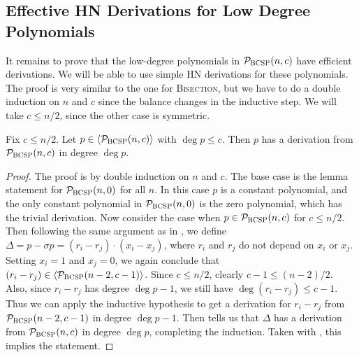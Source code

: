 \subsection{Effective HN Derivations for Low Degree Polynomials}
It remains to prove that the low-degree polynomials in $\mathcal P_{\textsc{BCSP}}(n,c)$ have efficient derivations. We will be able to use simple HN derivations for these polynomials. The proof is very similar to the one for \textsc{Bisection}, but we have to do a double induction on $n$ and $c$ since the balance changes in the inductive step. We will take $c \leq n/2$, since the other case is symmetric.
\begin{lemma}\label{lem:lowdeg-easy}
Fix $c \leq n/2$. Let $p \in \langle \mathcal P_{\textsc{BCSP}}(n,c) \rangle$ with $\deg p \leq c$. Then $p$ has a derivation from $\mathcal P_{\textsc{BCSP}}(n,c)$ in degree $\deg p$. 
\end{lemma}
\begin{proof}
The proof is by double induction on $n$ and $c$. The base case is the lemma statement for $\mathcal P_{\textsc{BCSP}}(n,0)$ for all $n$. In this case $p$ is a constant polynomial, and the only constant polynomial in $\mathcal P_{\textsc{BCSP}}(n,0)$ is the zero polynomial, which has the trivial derivation. Now consider the case when $p \in \mathcal P_{\textsc{BCSP}}(n,c)$ for $c \leq n/2$. Then following the same argument as in , we define $\Delta = p - \sigma p = (r_i - r_j)\cdot (x_i - x_j)$, where $r_i$ and $r_j$ do not depend on $x_i$ or $x_j$. Setting $x_i = 1$ and $x_j = 0$, we again conclude that $(r_i - r_j) \in \langle \mathcal P_{\textsc{BCSP}}(n-2,c-1) \rangle$. Since $c \leq n/2$, clearly $c-1 \leq (n-2)/2$. Also, since $r_i - r_j$ has degree $\deg p - 1$, we still have $\deg (r_i - r_j) \leq c-1$. Thus we can apply the inductive hypothesis to get a derivation for $r_i - r_j$ from $\mathcal P_{\textsc{BCSP}}(n-2,c-1)$ in degree $\deg p - 1$. Then  tells us that $\Delta$ has a derivation from $\mathcal P_{\textsc{BCSP}}(n,c)$ in degree $\deg p$, completing the induction. Taken with , this implies the statement. 
\end{proof}

